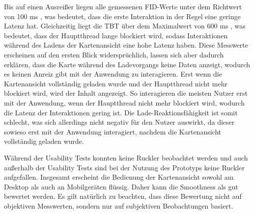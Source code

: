 Bis auf einen Ausreißer liegen alle gemessenen \ac{FID}-Werte unter dem Richtwert von 100 ms \cite{FID}, was bedeutet, dass die erste Interaktion in der Regel eine geringe Latenz hat. Gleichzeitig liegt die \ac{TBT} über dem Maximalwert von 600 ms \cite{TBT}, was bedeutet, dass der Hauptthread lange blockiert wird, sodass Interaktionen während des Ladens der Kartenansicht eine hohe Latenz haben. Diese Messwerte erscheinen auf den ersten Blick widersprüchlich, lassen sich aber dadurch erklären, dass die Karte während des Ladevorgangs keine Daten anzeigt, wodurch es keinen Anreiz gibt mit der Anwendung zu interagieren. Erst wenn die Kartenansicht vollständig geladen wurde und der Hauptthread nicht mehr blockiert wird, wird der Inhalt angezeigt. So interagieren die meisten Nutzer erst mit der Anwendung, wenn der Hauptthread nicht mehr blockiert wird, wodurch die Latenz der Interaktionen gering ist. Die Lade-Reaktionsfähigkeit ist somit schlecht, was sich allerdings nicht negativ für den Nutzer auswirkt, da dieser sowieso erst mit der Anwendung interagiert, nachdem die Kartenansicht vollständig geladen wurde.

Während der Usability Tests konnten keine Ruckler beobachtet werden und auch außerhalb der Usability Tests sind bei der Nutzung des Prototyps keine Ruckler aufgefallen. Insgesamt erscheint die Bedienung der Kartenansicht sowohl am Desktop als auch an Mobilgeräten flüssig. Daher kann die Smoothness als gut bewertet werden. Es gilt natürlich zu beachten, dass diese Bewertung nicht auf objektiven Messwerten, sondern nur auf subjektiven Beobachtungen basiert.

